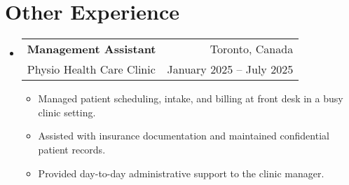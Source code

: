 \documentclass[letterpaper,11pt]{article}
\makeatletter
\newcommand{\resumeItemNH}[1]{
  \item\small{
    {#1 \vspace{-2pt}}
  }
}
\newcommand{\resumeSubheading}[4]{
  \vspace{-1pt}\item
    \begin{tabular*}{\textwidth}{l@{\extracolsep{\fill}}r}
      \textbf{#1} & #2 \\
      \small#3 & \small #4 \\
    \end{tabular*}\vspace{-6pt}
}
\newcommand{\resumeSubHeadingListStart}{\begin{itemize}[leftmargin=0pt,label={}]}
\newcommand{\resumeSubHeadingListEnd}{\end{itemize}}
\newcommand{\resumeItemListStart}{\begin{itemize}}
\newcommand{\resumeItemListEnd}{\end{itemize}}
\makeatother
\begin{document}
\section{Other Experience}
  \resumeSubHeadingListStart
    \resumeSubheading
      {Management Assistant}{Toronto, Canada}
      {Physio Health Care Clinic}{January 2025 -- July 2025}
      \resumeItemListStart
        \resumeItemNH{Managed patient scheduling, intake, and billing at front desk in a busy clinic setting.}
        \resumeItemNH{Assisted with insurance documentation and maintained confidential patient records.}
        \resumeItemNH{Provided day-to-day administrative support to the clinic manager.}
      \resumeItemListEnd
  \resumeSubHeadingListEnd
\end{document}
